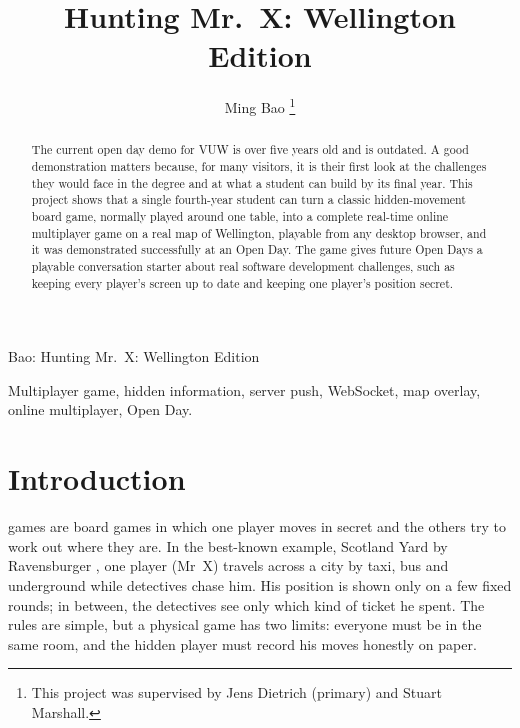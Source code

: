 \documentclass[lettersize,journal]{IEEEtran}
\begin{document}
\title{Hunting Mr.~X: Wellington Edition}

\author{Ming Bao
\thanks{This project was supervised by Jens Dietrich (primary) and Stuart Marshall.}
}

%
{Bao: Hunting Mr.~X: Wellington Edition}

\maketitle

\begin{abstract}
The current open day demo for VUW is over five years old and is outdated. A good demonstration matters because, for many visitors, it is their first look at the challenges they would face in the degree and at what a student can build by its final year. This project shows that a single fourth-year student can turn a classic hidden-movement board game, normally played around one table, into a complete real-time online multiplayer game on a real map of Wellington, playable from any desktop browser, and it was demonstrated successfully at an Open Day. The game gives future Open Days a playable conversation starter about real software development challenges, such as keeping every player's screen up to date and keeping one player's position secret.
\end{abstract}

\begin{IEEEkeywords}
Multiplayer game, hidden information, server push, WebSocket, map overlay, online multiplayer, Open Day.
\end{IEEEkeywords}

\section{Introduction}

 games are board games in which one player moves in secret and the others try to work out where they are. In the best-known example, Scotland Yard by Ravensburger \cite{rules_1983}, one player (Mr~X) travels across a city by taxi, bus and underground while detectives chase him. His position is shown only on a few fixed rounds; in between, the detectives see only which kind of ticket he spent. The rules are simple, but a physical game has two limits: everyone must be in the same room, and the hidden player must record his moves honestly on paper.
\end{document}
